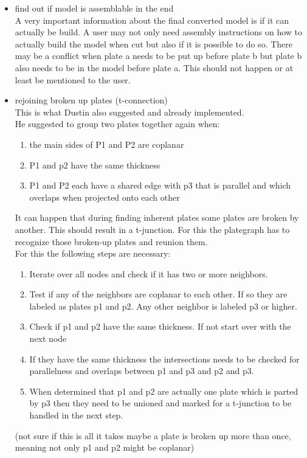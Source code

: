 \documentclass[../ClassicThesis.tex]{subfiles}
\begin{document}
\begin{itemize}
    \item find out if model is assemblable in the end\\
    A very important information about the final converted model is if it can actually be build. A user may not only need assembly instructions on how to actually build the model when cut but also if it is possible to do so. There may be a conflict when plate a needs to be put up before plate b but plate b also needs to be in the model before plate a. This should not happen or at least be mentioned to the user.
    \item rejoining broken up plates (t-connection)\\
    This is what Dustin also suggested and already implemented.\\
    He suggested to group two plates together again when:\\
    \begin{enumerate}
        \item the main sides of P1 and P2 are coplanar
        \item P1 and p2 have the same thickness
        \item P1 and P2 each have a shared edge with p3 that is parallel and which overlaps when projected onto each other
    \end{enumerate}
    It can happen that during finding inherent plates some plates are broken by another. This should result in a t-junction. For this the plategraph has to recognize those broken-up plates and reunion them. \\
    For this the following steps are necessary:
    \begin{enumerate}
        \item Iterate over all nodes and check if it has two or more neighbors. 
        \item Test if any of the neighbors are coplanar to each other. If so they are labeled as plates p1 and p2. Any other neighbor is labeled p3 or higher.
        \item Check if p1 and p2 have the same thickness. If not start over with the next node
        \item If they have the same thickness the intersections needs to be checked for parallelness and overlaps between p1 and p3 and p2 and p3.
        \item When determined that p1 and p2 are actually one plate which is parted by p3 then they need to be unioned and marked for a t-junction to be handled in the next step.
    \end{enumerate}
    (not sure if this is all it takes maybe a plate is broken up more than once, meaning not only p1 and p2 might be coplanar)
\end{itemize}
\end{document}
